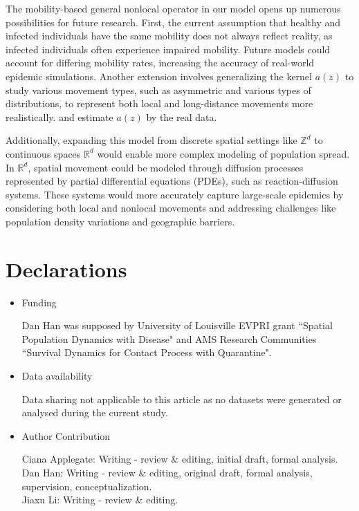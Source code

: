 \documentclass[sn-basic]{sn-jnl}%
\theoremstyle{thmstyleone}%
\theoremstyle{thmstyletwo}%
\theoremstyle{thmstylethree}%
\numberwithin{equation}{theorem}
\begin{document}
The mobility-based general nonlocal operator in our model opens up numerous possibilities for future research. First, the current assumption that healthy and infected individuals have the same mobility does not always reflect reality, as infected individuals often experience impaired mobility. Future models could account for differing mobility rates, increasing the accuracy of real-world epidemic simulations. Another extension involves generalizing the kernel $a(z)$ to study various movement types, such as asymmetric and various types of distributions, to represent both local and long-distance movements more realistically. and estimate $a(z)$ by the real data.

Additionally, expanding this model from discrete spatial settings like $\mathbb{Z}^d$ to continuous spaces $\mathbb{R}^d$ would enable more complex modeling of population spread. In $\mathbb{R}^d$, spatial movement could be modeled through diffusion processes represented by partial differential equations (PDEs), such as reaction-diffusion systems. These systems would more accurately capture large-scale epidemics by considering both local and nonlocal movements and addressing challenges like population density variations and geographic barriers.





\backmatter


\section*{Declarations}
\begin{itemize}
\item Funding

Dan Han was supposed by University of Louisville EVPRI grant ``Spatial Population Dynamics with Disease" and AMS Research Communities ``Survival Dynamics for Contact Process with Quarantine".


\item Data availability 

Data sharing not applicable to this article as no datasets were generated or analysed during
the current study.

\item Author Contribution

Ciana Applegate: Writing - review \& editing, initial draft, formal analysis.\\
Dan Han: Writing - review \& editing, original draft, formal analysis, supervision, conceptualization.\\
Jiaxu Li: Writing - review \& editing.
\end{itemize}
\end{document}
